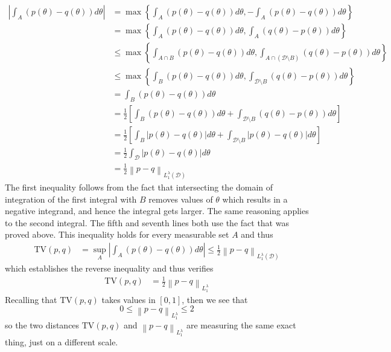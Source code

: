 \documentclass[12pt]{article}
\newcommand*{\norm}[1]{\left\lVert#1\right\rVert}
\newcommand*{\abs}[1]{\left\lvert#1\right\rvert}
\begin{document}
\begin{align*}
\abs{\int_A \left(p(\theta) - q(\theta)\right) d\theta} &= \max\left\{\int_A \left(p(\theta) - q(\theta)\right) d\theta, -\int_A \left(p(\theta) - q(\theta)\right) d\theta \right\} \\
										      &=  \max\left\{\int_A \left(p(\theta) - q(\theta)\right) d\theta, \int_A \left(q(\theta) - p(\theta)\right) d\theta \right\} \\
										      &\leq \max\left\{\int_{A \cap B} \left(p(\theta) - q(\theta)\right) d\theta, \int_{A \cap (\mathcal{D} \setminus B)} \left(q(\theta) - p(\theta)\right) d\theta \right\} \\
										      &\leq \max\left\{\int_{B} \left(p(\theta) - q(\theta)\right) d\theta, \int_{\mathcal{D} \setminus B} \left(q(\theta) - p(\theta)\right) d\theta \right\} \\
										      &= \int_{B} \left(p(\theta) - q(\theta)\right) d\theta \\
										      &= \frac{1}{2} \left[\int_{B} \left(p(\theta) - q(\theta)\right) d\theta + \int_{\mathcal{D} \setminus B} \left(q(\theta) - p(\theta) \right) d\theta \right] \\
										      &= \frac{1}{2} \left[\int_{B} \abs{p(\theta) - q(\theta)} d\theta + \int_{\mathcal{D} \setminus B} \abs{p(\theta) - q(\theta)} d\theta \right] \\
										      &= \frac{1}{2} \int_{\mathcal{D}} \abs{p(\theta) - q(\theta)} d\theta \\
										      &= \frac{1}{2} \norm{p - q}_{L_1^{\lambda}(\mathcal{D})}
\end{align*}
The first inequality follows from the fact that intersecting the domain of integration of the first integral with $B$ removes values of $\theta$ which results in a negative integrand, and hence the 
integral gets larger. The same reasoning applies to the second integral. The fifth and seventh lines both use the fact that was proved above. This inequality holds for every measurable set $A$ and thus 
\begin{align*}
\text{TV}(p, q) &= \sup_A \abs{\int_A \left(p(\theta) - q(\theta)\right) d\theta} \leq \frac{1}{2} \norm{p - q}_{L_1^{\lambda}(\mathcal{D})}
\end{align*}
which establishes the reverse inequality and thus verifies 
\begin{align*}
\text{TV}(p, q) &= \frac{1}{2} \norm{p - q}_{L_1^\lambda}
\end{align*}
Recalling that $\text{TV}(p, q)$ takes values in $[0, 1]$, then we see that 
\[0 \leq \norm{p - q}_{L_1^\lambda} \leq 2\]
so the two distances $\text{TV}(p, q)$ and $\norm{p - q}_{L_1^\lambda}$ are measuring the same exact thing, just on a different scale. 
\end{document}
